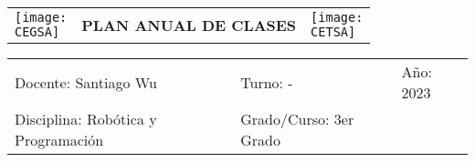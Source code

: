 \documentclass[landscape, a4paper, 10pt]{article}
\newcommand{\profesor}{Santiago Wu}
\newcommand{\discipline}{Robótica y Programación}
\newcommand{\currentyear}{2023}
\newcommand{\group}{3er Grado}
\newcommand{\CEGSA}{cegsa-logo.png}
\newcommand{\CETSA}{cetsa-logo.png}
\begin{document}
	\begin{tabularx}{\textwidth}{ >{\raggedright\arraybackslash}X >{\centering\arraybackslash}X >{\raggedleft\arraybackslash}X }
		\texttt{[image: \\CEGSA]} &
		\textbf{PLAN ANUAL DE CLASES} &
		\texttt{[image: \\CETSA]}
	\end{tabularx}
	\begin{tabularx}{\textwidth}{ >{\raggedright\arraybackslash}X >{\raggedright\arraybackslash}X >{\raggedright\arraybackslash}X }
		Docente: \profesor &
		Turno: - &
		Año: \currentyear \\
		Disciplina: \discipline &
		Grado/Curso: \group &
		 \\
	\end{tabularx}
	\centering
\end{document}
